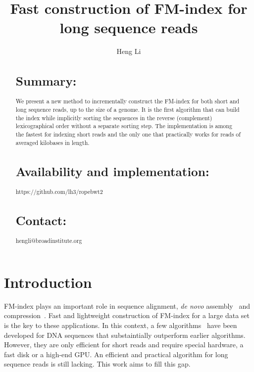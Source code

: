 \documentclass{bioinfo}
\begin{document}

\title[Constructing BWT]{Fast construction of FM-index for long sequence reads}

\author[Li]{Heng Li}

\address{Broad Institute, 7 Cambridge Center, Cambridge, MA 02142, USA}

\maketitle

\begin{abstract}
\section{Summary:} We present a new method to incrementally construct the
FM-index for both short and long sequence reads, up to the size of a genome.
It is the first algorithm that can build the index while implicitly sorting the
sequences in the reverse (complement) lexicographical order without a separate
sorting step. The implementation is among the fastest for indexing short reads
and the only one that practically works for reads of averaged kilobases in
length.

\section{Availability and implementation:} https://github.com/lh3/ropebwt2

\section{Contact:} hengli@broadinstitute.org
\end{abstract}

\section{Introduction}

FM-index plays an important role in sequence alignment, {\it de novo}
assembly~\citep{Simpson:2012aa} and compression~\citep{Cox:2012ly}. Fast
and lightweight construction of FM-index for a large data set is the key to
these applications. In this context, a few
algorithms~\citep{DBLP:journals/tcs/BauerCR13,DBLP:journals/corr/LiuLL14} have
been developed for DNA sequences that substaintially outperform earlier
algorithms.  However, they are only efficient for short reads and require
special hardware, a fast disk or a high-end GPU. An efficient and practical
algorithm for long sequence reads is still lacking. This work aims to fill this
gap.
\end{document}
